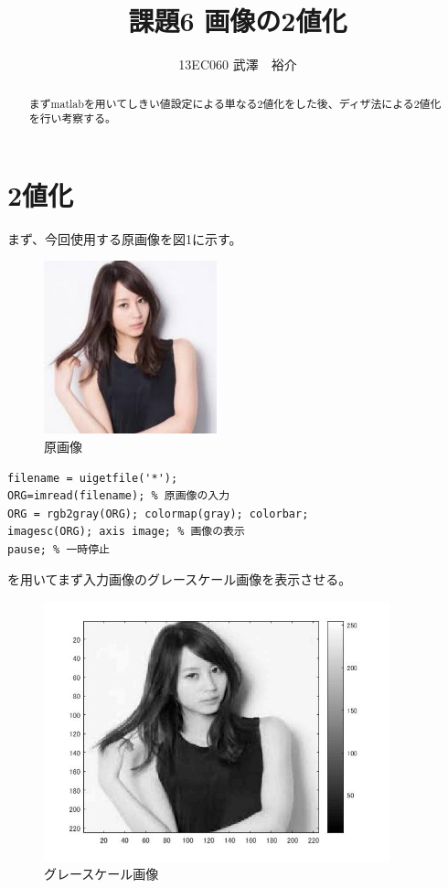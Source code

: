 \documentclass{jsarticle}
\begin{document}
\title{課題6 画像の2値化}
\author{13EC060 武澤　裕介}
\maketitle
\begin{abstract}
まずmatlabを用いてしきい値設定による単なる2値化をした後、ディザ法による2値化を行い考察する。
\end{abstract}
\section{2値化}
まず、今回使用する原画像を図1に示す。


\begin{figure}[htbp]
 \begin{center}
  \includegraphics[width=5cm,height=5cm]{index.jpg}
 \end{center}
 \caption{原画像}
\end{figure}

\begin{lstlisting}[basicstyle=\ttfamily\footnotesize, frame=single]
filename = uigetfile('*');
ORG=imread(filename); % 原画像の入力
ORG = rgb2gray(ORG); colormap(gray); colorbar;
imagesc(ORG); axis image; % 画像の表示
pause; % 一時停止
 \end{lstlisting}
を用いてまず入力画像のグレースケール画像を表示させる。

\newpage
\begin{figure}[htbp]
 \begin{center}
  \includegraphics[width=10cm]{kadai6-0.jpg}
 \end{center}
 \caption{グレースケール画像}
\end{figure}
\end{document}
